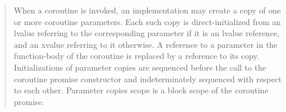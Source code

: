\begin{quote}

\pnum
When a coroutine is invoked, an implementation may create a copy of one or more coroutine parameters. Each such copy is direct-initialized from an lvalue referring to the corresponding parameter if it is an lvalue reference, and an xvalue referring to it otherwise. A reference to a parameter in the function-body of the coroutine is replaced by a reference to its copy.
Initializations of parameter copies are sequenced before the call to the coroutine promise constructor and indeterminately sequenced with respect to each other.
Parameter copies scope is a block scope of the coroutine promise.
%
%







\end{quote}
